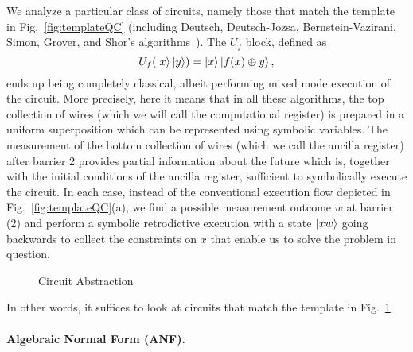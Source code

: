\documentclass[sigplan,review]{acmart}
\begin{document}
We analyze a particular class of circuits, namely those
that match the template in Fig.~\ref{fig:templateQC} (including
Deutsch, Deutsch-Jozsa, Bernstein-Vazirani, Simon, Grover, and Shor's
algorithms~\cite{doi:10.1137/S0097539796300921,deutsch,deutschJozsa,365701,doi:10.1137/S0097539795293172,nielsen_chuang_2010,10.1145/237814.237866}). 
The $U_f$ block, defined as 
\begin{equation}
  U_f(\ket{x}\ket{y}) = \ket{x}\ket{f(x) \oplus y},
\end{equation}
ends up being completely classical, albeit performing mixed mode
execution of the circuit. More precisely, here it means that in
all these algorithms, the top collection of wires (which we will call
the computational register) is prepared in a uniform superposition
which can be represented using symbolic variables. The measurement of
the bottom collection of wires (which we call the ancilla register)
after barrier 2 provides partial information about the future which
is, together with the initial conditions of the ancilla register,
sufficient to symbolically execute the circuit. In each case, instead
of the conventional execution flow depicted in
Fig.~\ref{fig:templateQC}(a), we find a possible measurement outcome
$w$ at barrier (2) and perform a symbolic retrodictive execution with
a state $\ket{xw}$ going backwards to collect the constraints on $x$
that enable us to solve the problem in question.

\begin{figure}[t]
\caption{\label{fig:CircuitAbstraction}Circuit Abstraction}
\end{figure}

In other words, it suffices to look at circuits that match the
template in Fig.~\ref{fig:CircuitAbstraction}.

\paragraph*{Algebraic Normal Form (ANF).}
\end{document}
